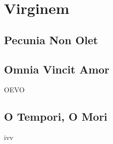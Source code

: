 \section{Virginem}

\subsection{Pecunia Non Olet}

\blindtext

\subsection{Omnia Vincit Amor}

\blindtext\gls{OEVO}

\blindtext

\subsection{O Tempori, O Mori}

\blindtext\gls{ivv}